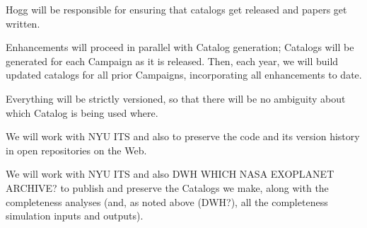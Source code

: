 \documentclass[12pt,preprint]{aastex}
\begin{document}
Hogg will be responsible for ensuring that catalogs get released and
papers get written.

Enhancements will proceed in parallel with Catalog generation;
Catalogs will be generated for each Campaign as it is released.
Then, each year, we will build updated catalogs for all prior
Campaigns, incorporating all enhancements to date.

Everything will be strictly versioned, so that there will be no
ambiguity about which Catalog is being used where.

We will work with NYU ITS and also  to preserve
the code and its version history in open repositories on the Web.

We will work with NYU ITS and also DWH WHICH NASA EXOPLANET ARCHIVE?
to publish and preserve the Catalogs we make, along with the
completeness analyses (and, as noted above (DWH?), all the
completeness simulation inputs and outputs).
\end{document}
